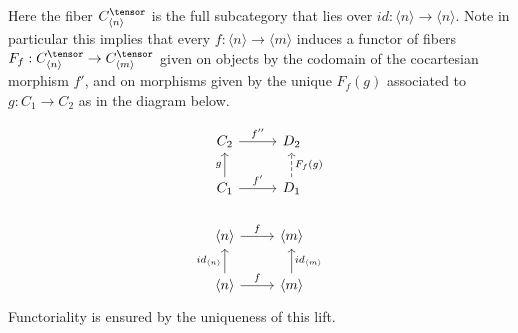 Here the fiber $C_{\langle n \rangle}^\tensor$ is the full subcategory that lies over $id:\langle n \rangle \rightarrow \langle n\rangle$. Note in particular this implies that every $f:\langle n \rangle \rightarrow \langle m \rangle$ induces a functor of fibers $F_f:C^\tensor_{\langle n\rangle}\rightarrow C^\tensor_{\langle m\rangle}$ given on objects by the codomain of the cocartesian morphism $f'$, and on morphisms given by the unique $F_f(g)$ associated to $g:C_1\rightarrow C_2$ as in the diagram below.

\[\begin{tikzcd}
C_2 \arrow[r, "f''"]                                                  & D_2                                                    \\
C_1 \arrow[r, "f'"] \arrow[u, "g"]                                    & D_1 \arrow[u, "F_f(g)"', dashed]                         \\
\langle n \rangle \arrow[r, "f"]                                      & \langle m \rangle                                      \\
\langle n \rangle  \arrow[r, "f"] \arrow[u, "id_{\langle n \rangle}"] & \langle m \rangle \arrow[u, "id_{\langle m \rangle}"']
\end{tikzcd}\]
Functoriality is ensured by the uniqueness of this lift.

